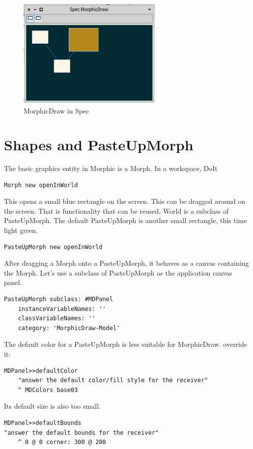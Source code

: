 \documentclass[10pt, twoside]{article}   	%
\begin{document}
\begin{figure}[htb]
\begin{center}
\includegraphics[width=200pt]{SpecMorphicDraw.png}
\caption{MorphicDraw in Spec}
\label{spec}
\end{center}
\end{figure}
\section{Shapes and PasteUpMorph}
The basic graphics entity in Morphic is a Morph. In a workspace, DoIt
\begin{verbatim}
Morph new openInWorld
\end{verbatim}
This opens a small blue rectangle on the screen. This can be dragged around on 
the screen. That is functionality that can be reused. World is a subclass of 
PasteUpMorph. The default PasteUpMorph is another small rectangle, this
time light green. 
\begin{verbatim}
PasteUpMorph new openInWorld
\end{verbatim}
After dragging a Morph onto a PasteUpMorph, it behaves as
a canvas containing the Morph. Let's use a subclass of PasteUpMorph
as the application canvas panel. 
\begin{verbatim}
PasteUpMorph subclass: #MDPanel
    instanceVariableNames: ''
    classVariableNames: ''
    category: 'MorphicDraw-Model'
\end{verbatim}
The default color for a PasteUpMorph is less suitable for MorphicDraw.
override it:
\begin{verbatim}
MDPanel>>defaultColor
    "answer the default color/fill style for the receiver"
    ^ MDColors base03
\end{verbatim}
Its default size is also too small.
\begin{verbatim}
MDPanel>>defaultBounds
"answer the default bounds for the receiver"
    ^ 0 @ 0 corner: 300 @ 200
\end{verbatim}
\end{document}
